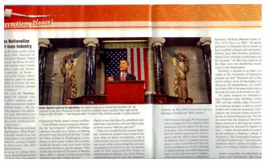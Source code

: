 \begin{frame}
    \centering
    \includegraphics[width=.9\textwidth]{img/obama-fasces.jpg} \\
\end{frame}

